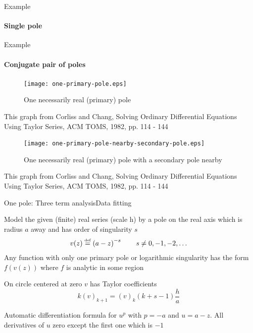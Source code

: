 \documentclass[11pt,svgnames,fleqn]{beamer}
\newcommand{\defeq}{\stackrel{\textup{\tiny def}}{=}}
\newcommand{\parbg}[1]{\left(  {#1} \right)}
\newcommand{\DM}[1]{\begin{displaymath} {#1} \end{displaymath}}
\newcommand{\tc}[2]{(#1)_{#2}}
\begin{document}
\begin{frame}{Example}
\framesubtitle{Single pole}

\end{frame}

\begin{frame}{Example}
\framesubtitle{Conjugate pair of poles}

\end{frame}
\begin{frame}

\begin{figure}
  \centering
  \vspace{-0.4cm}
  \texttt{[image: one-primary-pole.eps]} %
  \caption{One necessarily real (primary) pole}
\end{figure}

  {\footnotesize This graph from Corliss and Chang, Solving Ordinary Differential Equations 
  Using Taylor Series, ACM TOMS, 1982, pp. 114 - 144}
\end{frame}

\begin{frame}

\begin{figure}
  \centering
  \vspace{-0.4cm}
  \texttt{[image: one-primary-pole-nearby-secondary-pole.eps]} %
  \caption{One necessarily real (primary) pole with a secondary pole nearby}
\end{figure}

  {\footnotesize This graph from Corliss and Chang, Solving Ordinary Differential Equations 
  Using Taylor Series, ACM TOMS, 1982, pp. 114 - 144}
\end{frame}

\begin{frame}{One pole: Three term analysis}{Data fitting}

  Model the given (finite) real series (scale h) by a pole on the real axis which is radius $a$ away
  and has order of singularity $s$
  \DM
  {
    v(z) \defeq \parbg{a-z}^{-s}  \qquad s \neq 0, -1, -2, \ldots
  }
  Any function with only one primary pole or logarithmic singularity
  has the form $f(v(z))$ where $f$ is analytic in some region

  \vspace{2mm}

  On circle centered at zero $v$ has Taylor coefficients 
  \DM
  {
    k \tc{v}{k+1} = \tc{v}{k}\parbg{k+s-1}\frac{h}{a}
  }
 
  Automatic differentiation formula for $u^p$ with $p=-a$ and $u=a-z$. All derivatives of $u$ zero
  except the first one which is $-1$
\end{frame}
\end{document}
